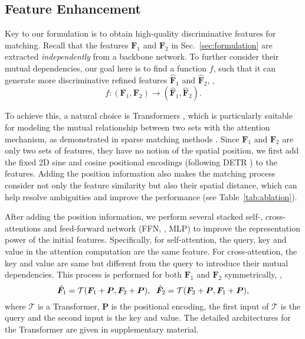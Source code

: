 \documentclass[10pt,twocolumn,letterpaper]{article}
\begin{document}
\subsection{Feature Enhancement}

Key to our formulation is to obtain high-quality discriminative features for matching. Recall that the features ${\bm F}_1$ and ${\bm F}_2$ in Sec.~\ref{sec:formulation} are extracted \emph{independently} from a backbone network. To further consider their mutual dependencies, our goal here is to find a function $f$, such that it can generate more discriminative refined features $\hat{\bm F}_1$ and $\hat{\bm F}_2$, \ie,
\begin{equation}
\label{eq:refine_feature}
    f: ({\bm F}_1, {\bm F}_2) \to (\hat{\bm F}_1, \hat{\bm F}_2).
\end{equation}

To achieve this, a natural choice is Transformers \cite{vaswani2017attention}, which is particularly suitable for modeling the mutual relationship between two sets with the attention mechanism, as demonstrated in sparse matching methods \cite{sarlin2020superglue,sun2021loftr}. Since ${\bm F}_1$ and ${\bm F}_2$ are only two sets of features, they have no notion of the spatial position, we first add the fixed 2D sine and cosine positional encodings (following DETR \cite{carion2020end}) to the features. Adding the position information also makes the matching process consider not only the feature similarity but also their spatial distance, which can help resolve ambiguities and improve the performance (see Table~\ref{tab:ablation}).

After adding the position information, we perform several stacked self-, cross-attentions and feed-forward network (FFN, \ie, MLP) \cite{vaswani2017attention} to improve the representation power of the initial features. Specifically, for self-attention, the query, key and value in the attention computation \cite{vaswani2017attention} are the same feature. For cross-attention, the key and value are same but different from the query to introduce their mutual dependencies. This process is performed for both ${\bm F}_1$ and ${\bm F}_2$ symmetrically, \ie,
\begin{equation}
    \hat{\bm F}_1 = \mathcal{T}({\bm F}_1 + {\bm P}, {\bm F}_2 + {\bm P}), \hspace{0.6em} \hat{\bm F}_2 = \mathcal{T}({\bm F}_2 + {\bm P}, {\bm F}_1 + {\bm P}),
\end{equation}
where $\mathcal{T}$ is a Transformer, ${\bm P}$ is the positional encoding, the first input of $\mathcal{T}$ is the query and the second input is the key and value.
The detailed architectures for the Transformer are given in supplementary material.
\end{document}

